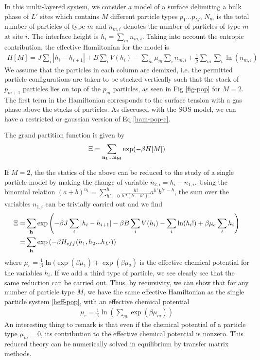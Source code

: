 In this multi-layered system, we consider a model of a surface delimiting a bulk phase of $L'$ sites which contains $M$ different particle types $p_1 ... p_M$, $N_m$ is the total number of particles of type $m$ and $n_{m,i}$ denotes the number of particles of type $m$ at site $i$. The interface height is $h_i = \sum_m n_{m,i}$. Taking into account the entropic contribution, the effective Hamiltonian for the model is
\begin{align}
    H[M] = J \sum_i |h_i-h_{i+1}| + B \sum_i V(h_i) - \sum_m \mu_m \sum_i n_{m,i} + \frac{1}{\beta} \sum_m \sum_i \ln(n_{m,i})
    \label{ham-pop-c}
\end{align}
We assume that the particles in each column are demixed, i.e. the permitted particle configurations are taken to be stacked vertically such that the stack of $p_{m+1}$ particles lies on top  of the $p_m$ particles, as seen in Fig \ref{fig-pop} for $M=2$. The first term in the Hamiltonian corresponds to the surface tension with a gas phase above the stacks of particles. As disccused with the SOS model, we can have a restricted or gaussian version of Eq \ref{ham-pop-c}. 

The grand partition function is given by
\begin{align}
    \Xi = \sum_{{\bf n_1...n_M}} \exp(-\beta H[M])
\end{align}

If $M=2$, the the statics of the above can be reduced to the study of a single particle model by making the change of variable $n_{2,i} = h_i - n_{1,i}$. Using the binomial relation ${(a+b)^{n_1} = \sum_{h'=0}^h \frac{h!}{h'! (h-h')!} a^{h'} b^{h'-h}}$, the sum over the variables $n_{1,i}$ can be trivially carried out and we find
\begin{align}
    \Xi =& \sum_{\bf h} \exp \left( -\beta J \sum_i |h_i-h_{i+1}| - \beta B \sum_i V(h_i) - \sum_i \ln(h_i!) + \beta \mu_e \sum_i h_i \right) \nonumber \\
    =& \sum_{\bf h} \exp \left( -\beta H_{eff}(h_1,h_2...h_{L'}) \right)
\end{align}
where $\mu_e = \frac{1}{\beta}\ln( \exp(\beta \mu_1) + \exp(\beta \mu_2)$ is the effective chemical potential for the variables $h_i$. If we add a third type of particle, we see clearly see that the same reduction can be carried out. Thus, by recursivity, we can show that for any number of particle type $M$, we have the same effective Hamiltonian as the single particle system \eqref{heff-pop}, with an effective chemical potential
\begin{align}
    \mu_e = \frac{1}{\beta} \ln \left( \sum_m \exp( \beta \mu_m ) \right)
\end{align}
An interesting thing to remark is that even if the chemical potential of a particle type $\mu_m = 0$, its contribution to the effective chemical potential is nonzero. 
This reduced theory can be numerically solved in equilibrium by transfer matrix methods. 

